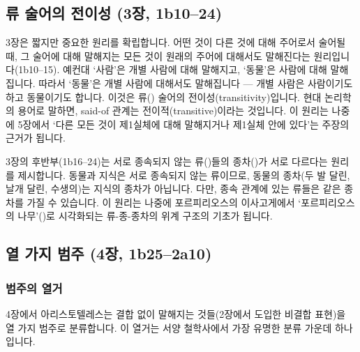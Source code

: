 \documentclass[12pt, a4paper]{article}
\begin{document}
\subsection{류 술어의 전이성 (3장, 1b10--24)}

3장은 짧지만 중요한 원리를 확립합니다. 어떤 것이 다른 것에 대해 주어로서 술어될 때, 그 술어에 대해 말해지는 모든 것이 원래의 주어에 대해서도 말해진다는 원리입니다(1b10--15). 예컨대 `사람'은 개별 사람에 대해 말해지고, `동물'은 사람에 대해 말해집니다. 따라서 `동물'은 개별 사람에 대해서도 말해집니다 --- 개별 사람은 사람이기도 하고 동물이기도 합니다. 이것은 류() 술어의 전이성(transitivity)입니다. 현대 논리학의 용어로 말하면, said-of 관계는 전이적(transitive)이라는 것입니다. 이 원리는 나중에 5장에서 `다른 모든 것이 제1실체에 대해 말해지거나 제1실체 안에 있다'는 주장의 근거가 됩니다.

3장의 후반부(1b16--24)는 서로 종속되지 않는 류()들의 종차()가 서로 다르다는 원리를 제시합니다. 동물과 지식은 서로 종속되지 않는 류이므로, 동물의 종차(두 발 달린, 날개 달린, 수생의)는 지식의 종차가 아닙니다. 다만, 종속 관계에 있는 류들은 같은 종차를 가질 수 있습니다. 이 원리는 나중에 포르피리오스의 이사고게에서 `포르피리오스의 나무'()로 시각화되는 류-종-종차의 위계 구조의 기초가 됩니다.

\subsection{열 가지 범주 (4장, 1b25--2a10)}
\vspace{-6pt}

\subsubsection{범주의 열거}

4장에서 아리스토텔레스는 결합 없이 말해지는 것들(2장에서 도입한 비결합 표현)을 열 가지 범주로 분류합니다. 이 열거는 서양 철학사에서 가장 유명한 분류 가운데 하나입니다.
\par\nobreak\vspace{-\parskip}

\end{document}
